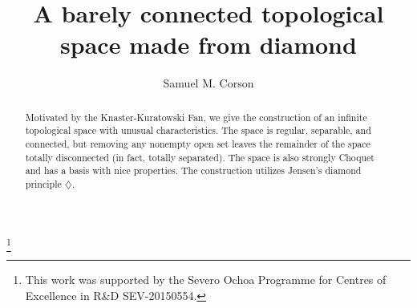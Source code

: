 \documentclass{amsart}
\title{A barely connected topological space made from diamond}
\author{Samuel M. Corson}
\theoremstyle{definition}\newtheorem{theorem}{Theorem}
\theoremstyle{definition}\newtheorem{bigtheorem}{Theorem}
\numberwithin{theorem}{section}
\theoremstyle{definition}\newtheorem{corollary}[theorem]{Corollary}
\theoremstyle{definition}\newtheorem{proposition}[theorem]{Proposition}
\theoremstyle{definition}\newtheorem{definition}[theorem]{Definition}
\theoremstyle{definition}\newtheorem{question}[theorem]{Question}
\theoremstyle{definition}\newtheorem{example}[theorem]{Example}
\theoremstyle{definition}\newtheorem{remark}[theorem]{Remark}
\theoremstyle{definition}\newtheorem{note}[theorem]{Note}
\theoremstyle{definition}\newtheorem{lemma}[theorem]{Lemma}
\theoremstyle{definition}\newtheorem{fact}[theorem]{Fact}
\theoremstyle{definition}\newtheorem{define}[theorem]{Definition}
\theoremstyle{definition}\newtheorem{definitions}[theorem]{Definitions}
\theoremstyle{definition}\newtheorem{claim}[theorem]{Claim}
\theoremstyle{definition}\newtheorem{obs}[theorem]{Observation}
\theoremstyle{definition}\newtheorem{construction}[theorem]{Construction}
\begin{document}
\address{Instituto de Ciencias Matem\'aticas CSIC-UAM-UC3M-UCM, 28049 Madrid, Spain.}

\thanks{This work was supported by the Severo Ochoa Programme for Centres of Excellence in R\&D SEV-20150554.}

\begin{abstract} Motivated by the Knaster-Kuratowski Fan, we give the construction of an infinite topological space with unusual characteristics.   The space is regular, separable, and connected, but removing any nonempty open set leaves the remainder of the space totally disconnected (in fact, totally separated).  The space is also strongly Choquet and has a basis with nice properties.  The construction utilizes Jensen's diamond principle $\diamondsuit$.
\end{abstract}

\maketitle
\end{document}
